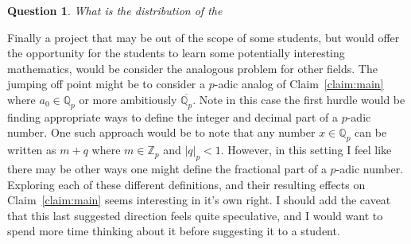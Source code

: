 \documentclass[10pt,reqno]{amsart}
\newtheorem{question}[lemma]{Question}
\theoremstyle{remark}
\newcommand{\Q}{\mathbb{Q}}
\newcommand{\Z}{\mathbb{Z}}
\begin{document}
\begin{question}
What is the distribution of the 
\end{question}

Finally a project that may be out of the scope of some students, but would offer the opportunity for the students to learn some potentially interesting mathematics, would be consider the analogous problem for other fields. The jumping off point might be to consider a $p$-adic analog of Claim~\ref{claim:main} where $a_{0}\in \Q_{p}$ or more ambitiously $\overline{\Q_{p}}$. Note in this case the first hurdle would be finding appropriate ways to define the integer and decimal part of a $p$-adic number. One such approach would be to note that any number $x\in \Q_{p}$ can be written as $m+q$ where $m\in \Z_{p}$ and $|q|_{p}<1$. However, in this setting I feel like there may be other ways one might define the fractional part of a $p$-adic number. Exploring each of these different definitions, and their resulting effects on Claim~\ref{claim:main} seems interesting in it's own right. I should add the caveat that this last suggested direction feels quite speculative, and I would want to spend more time thinking about it before suggesting it to a student. 
\end{document}
